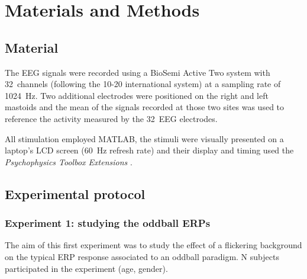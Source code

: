 \documentclass[10pt]{article}
\begin{document}




\section{Materials and Methods}
\label{sec:2MatAndMet}

    \subsection{Material}
    \label{sec:2.1Material}

    The EEG signals were recorded using a BioSemi Active Two system with 32~channels (following the 10-20 international system) at a sampling rate of \SI{1024}{\Hz}.
    Two additional electrodes were positioned on the right and left mastoids and the mean of the signals recorded at those two sites was used to reference the activity measured by the 32~EEG electrodes.

    All stimulation employed MATLAB\textsuperscript{\textregistered}, the stimuli were visually presented on a laptop's LCD screen (\SI{60}{\Hz} refresh rate) and their display and timing used the \emph{Psychophysics Toolbox Extensions} \parencite{Brainard1997,Pelli1997}.


    \subsection{Experimental protocol}
    \label{sec:2.2Protocol}

        \subsubsection{Experiment 1: studying the oddball \acsp{ERP}}
        \label{sec:2.2.1ProtocolOddball}

        The aim of this first experiment was to study the effect of a flickering background on the typical \ac{ERP} response associated to an oddball paradigm.
        N subjects participated in the experiment (age, gender).
\end{document}
